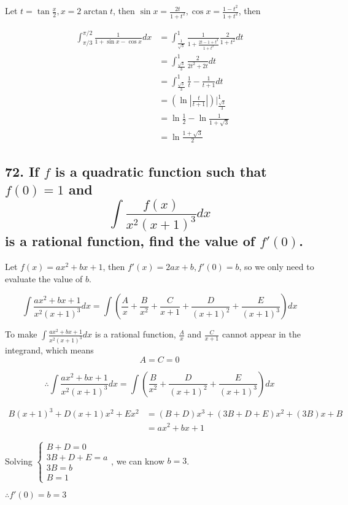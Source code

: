 \documentclass{article}
\begin{document}
    Let $t = \tan \frac x 2, x = 2\arctan t$, then $\sin x = \frac{2t}{1 + t^2}, \cos x = \frac{1 - t^2}{1 + t^2}$, then

    $$\begin{aligned}
        \int_{\pi/3}^{\pi/2} \frac{1}{1 + \sin x - \cos x} dx &= \int_{\frac{1}{\sqrt 3}}^{1} \frac{1}{1 + \frac{2t - 1 + t^2}{1 + t^2}} \frac{2}{1 + t^2} dt \\
        &= \int_{\frac{\sqrt 3}{3}}^1 \frac{2}{2t^2 + 2t}dt \\
        &= \int_{\frac{\sqrt 3}{3}}^1 \frac{1}{t} - \frac{1}{t + 1} dt \\
        &= (\ln|\frac{t}{t + 1}|)\biggl|_{\frac{\sqrt 3}{3}}^1 \\
        &= \ln\frac 1 2 - \ln \frac{1}{1 + \sqrt 3} \\
        &= \ln \frac{1 + \sqrt 3}{2}
    \end{aligned}$$

    \subsection*{72. If $f$ is a quadratic function such that $f(0) = 1$ and $$\int \frac{f(x)}{x^2(x + 1)^3}dx $$ is a rational function, find the value of $f'(0)$.}

    Let $f(x) = ax^2 + bx + 1$, then $f'(x) = 2ax + b, f'(0) = b$, so we only need to evaluate the value of $b$.
    
    $$\int \frac{ax^2 + bx + 1}{x^2(x + 1)^3} dx = \int (\frac{A}{x} + \frac{B}{x^2} + \frac{C}{x + 1} + \frac{D}{(x + 1)^2} + \frac{E}{(x + 1)^3}) dx $$

    To make $\int \frac{ax^2 + bx + 1}{x^2(x + 1)^3} dx$ is a rational function, $\frac A x$ and $\frac{C}{x + 1}$ cannot appear in the integrand, which means $$A = C = 0$$

    $$\therefore \int \frac{ax^2 + bx + 1}{x^2(x + 1)^3} dx = \int (\frac{B}{x^2} + \frac{D}{(x + 1)^2} + \frac{E}{(x + 1)^3}) dx $$

    $$\begin{aligned}
        B(x + 1)^3 + D(x + 1)x^2 + Ex^2 &= (B + D)x^3 + (3B + D + E)x^2 + (3B)x + B \\ 
        &= ax^2 + bx + 1
    \end{aligned}$$

    Solving $\left\{ \begin{array}{ll}
        B + D = 0 \\
        3B + D + E = a \\
        3B = b \\
        B = 1
    \end{array} \right.$, we can know $b = 3$.

    $\therefore f'(0) = b = 3$
\end{document}
